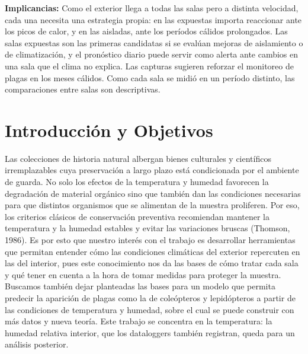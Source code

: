 \documentclass[11pt,a4paper]{article}
\begin{document}
\textbf{Implicancias:} Como el exterior llega a todas las salas pero a distinta velocidad, cada una necesita una estrategia propia: en las expuestas importa reaccionar ante los picos de calor, y en las aisladas, ante los períodos cálidos prolongados. Las salas expuestas son las primeras candidatas si se evalúan mejoras de aislamiento o de climatización, y el pronóstico diario puede servir como alerta ante cambios en una sala que el clima no explica. Las capturas sugieren reforzar el monitoreo de plagas en los meses cálidos. Como cada sala se midió en un período distinto, las comparaciones entre salas son descriptivas.

\section{Introducción y Objetivos}

Las colecciones de historia natural albergan bienes culturales y científicos irremplazables cuya preservación a largo plazo está condicionada por el ambiente de guarda. No solo los efectos de la temperatura y humedad favorecen la degradación de material orgánico sino que también dan las condiciones necesarias para que distintos organismos que se alimentan de la muestra proliferen. Por eso, los criterios clásicos de conservación preventiva recomiendan mantener la temperatura y la humedad estables y evitar las variaciones bruscas (Thomson, 1986). Es por esto que nuestro interés con el trabajo es desarrollar herramientas que permitan entender cómo las condiciones climáticas del exterior repercuten en las del interior, pues este conocimiento nos da las bases de cómo tratar cada sala y qué tener en cuenta a la hora de tomar medidas para proteger la muestra. Buscamos también dejar planteadas las bases para un modelo que permita predecir la aparición de plagas como la de coleópteros y lepidópteros a partir de las condiciones de temperatura y humedad, sobre el cual se puede construir con más datos y nueva teoría. Este trabajo se concentra en la temperatura: la humedad relativa interior, que los dataloggers también registran, queda para un análisis posterior.
\end{document}

